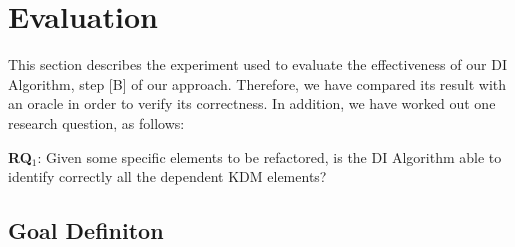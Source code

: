 
\section{Evaluation}\label{sec:evaluation}

This section describes the experiment used to evaluate the effectiveness of our DI Algorithm, step [B] of our approach. Therefore, we have compared its result with an oracle in order to verify its correctness. %
In addition, we have worked out one research question, as follows:


\textbf{RQ$_{1}$}: Given some specific elements to be refactored, is the DI Algorithm able to identify correctly all the dependent KDM elements?

 

\subsection{Goal Definiton}\label{sec:goal_definition}

